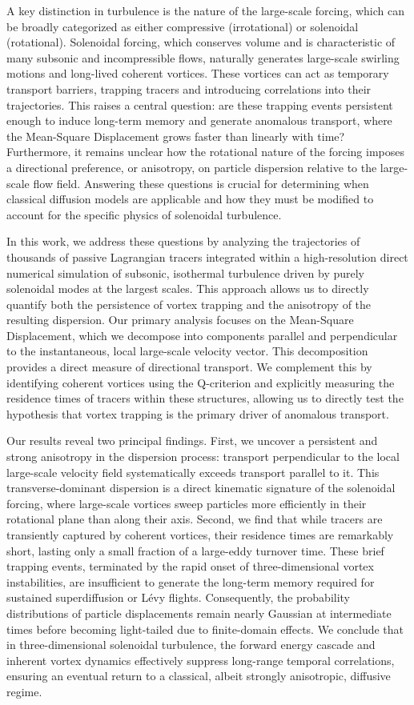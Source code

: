 \documentclass[]{article}
\begin{document}
A key distinction in turbulence is the nature of the large-scale forcing, which can be broadly categorized as either compressive (irrotational) or solenoidal (rotational). Solenoidal forcing, which conserves volume and is characteristic of many subsonic and incompressible flows, naturally generates large-scale swirling motions and long-lived coherent vortices. These vortices can act as temporary transport barriers, trapping tracers and introducing correlations into their trajectories. This raises a central question: are these trapping events persistent enough to induce long-term memory and generate anomalous transport, where the Mean-Square Displacement grows faster than linearly with time? Furthermore, it remains unclear how the rotational nature of the forcing imposes a directional preference, or anisotropy, on particle dispersion relative to the large-scale flow field. Answering these questions is crucial for determining when classical diffusion models are applicable and how they must be modified to account for the specific physics of solenoidal turbulence.

In this work, we address these questions by analyzing the trajectories of thousands of passive Lagrangian tracers integrated within a high-resolution direct numerical simulation of subsonic, isothermal turbulence driven by purely solenoidal modes at the largest scales. This approach allows us to directly quantify both the persistence of vortex trapping and the anisotropy of the resulting dispersion. Our primary analysis focuses on the Mean-Square Displacement, which we decompose into components parallel and perpendicular to the instantaneous, local large-scale velocity vector. This decomposition provides a direct measure of directional transport. We complement this by identifying coherent vortices using the Q-criterion and explicitly measuring the residence times of tracers within these structures, allowing us to directly test the hypothesis that vortex trapping is the primary driver of anomalous transport.

Our results reveal two principal findings. First, we uncover a persistent and strong anisotropy in the dispersion process: transport perpendicular to the local large-scale velocity field systematically exceeds transport parallel to it. This transverse-dominant dispersion is a direct kinematic signature of the solenoidal forcing, where large-scale vortices sweep particles more efficiently in their rotational plane than along their axis. Second, we find that while tracers are transiently captured by coherent vortices, their residence times are remarkably short, lasting only a small fraction of a large-eddy turnover time. These brief trapping events, terminated by the rapid onset of three-dimensional vortex instabilities, are insufficient to generate the long-term memory required for sustained superdiffusion or Lévy flights. Consequently, the probability distributions of particle displacements remain nearly Gaussian at intermediate times before becoming light-tailed due to finite-domain effects. We conclude that in three-dimensional solenoidal turbulence, the forward energy cascade and inherent vortex dynamics effectively suppress long-range temporal correlations, ensuring an eventual return to a classical, albeit strongly anisotropic, diffusive regime.
\end{document}
